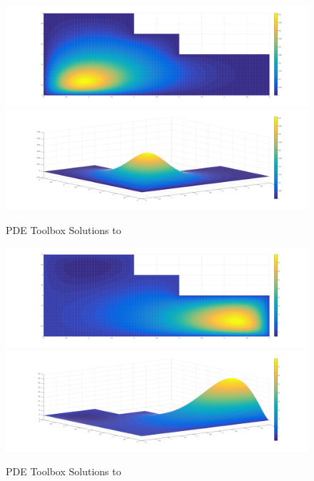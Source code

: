 \documentclass[10pt,a4paper]{article}
\begin{document}
\begin{figure}[H]
\includegraphics[width=\linewidth]{figures/gaussian-top-pdetool.png}
\includegraphics[width=\linewidth]{figures/gaussian-iso-pdetool.png}
\caption{PDE Toolbox Solutions to }
\label{fig: pdetool gaussian solutions}
\end{figure}


\begin{figure}[H]
\includegraphics[width=\linewidth]{figures/cubic-top-pdetool.png}
\includegraphics[width=\linewidth]{figures/cubic-iso-pdetool.png}
\caption{PDE Toolbox Solutions to }
\label{fig: pdetool cubic solutions}
\end{figure}
\end{document}
